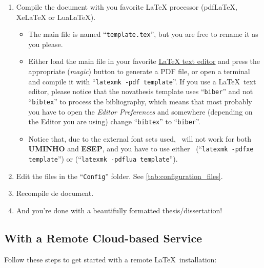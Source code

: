 \begin{enumerate}
  \item Compile the document with you favorite LaTeX processor (pdfLaTeX, XeLaTeX or LuaLaTeX).
        \begin{itemize}
          \item The main file is named “\verb!template.tex!”, but you are free to rename it as you please.
          \item Either load the main file in your favorite \href{https://en.wikipedia.org/wiki/Comparison_of_TeX_editors}{LaTeX text editor} and press the appropriate (\emph{magic}) button to generate a PDF file, or open a terminal and compile it with “\verb!latexmk -pdf template!”. If you use a \LaTeX\ text editor, please notice that the \gls{novathesis} template uses “\verb!biber!” and not “\verb!bibtex!” to process the bibliography, which means that most probably you have to open the \emph{Editor Preferences} and somewhere (depending on the Editor you are using) change “\verb!bibtex!” to “\verb!biber!”.
          \item Notice that, due to the external font sets used, \pdfLaTeX\ will not work for both \textbf{UMINHO} and \textbf{ESEP}, and you have to use either \XeLaTeX\ (“\verb!latexmk -pdfxe template!”) or \LuaLaTeX (“\verb!latexmk -pdflua template!”).
        \end{itemize}
  \item Edit the files in the “\texttt{Config}” folder.  See \autoref{tab:configuration_files}.
  \item Recompile de document.
  \item And you're done with a beautifully formatted thesis/dissertation! {\setlength{\twemojiDefaultHeight}{1.5\twemojiDefaultHeight}\emojiSmile}
\end{enumerate}


\subsection{With a Remote Cloud-based Service} %
\label{sub:with_a_remote_cloud_based_service}

Follow these steps to get started with a remote \LaTeX\ installation:

